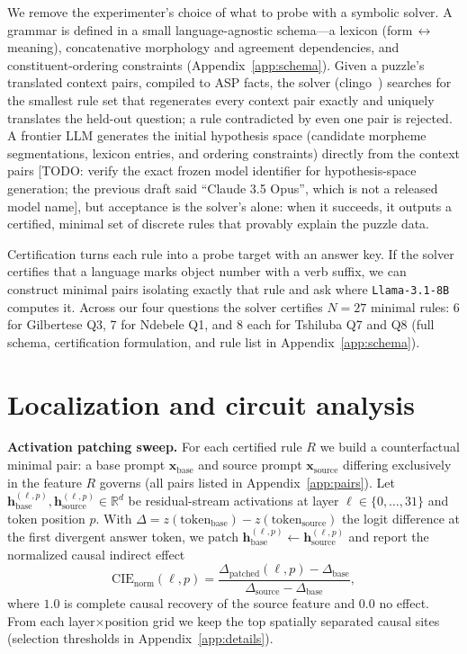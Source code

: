 \documentclass{article}
\newif\ifdraft\drafttrue
\newcommand{\TODO}[1]{\ifdraft\textcolor{red!70!black}{[TODO: #1]}\fi}
\begin{document}
We remove the experimenter's choice of what to probe with a symbolic solver.
A grammar is defined in a small language-agnostic schema---a lexicon
(form\,$\leftrightarrow$\,meaning), concatenative morphology and agreement
dependencies, and constituent-ordering constraints (Appendix~\ref{app:schema}).
Given a puzzle's translated context pairs, compiled to ASP facts, the solver
(clingo~\citep{clingo}) searches for the smallest rule set that regenerates
every context pair exactly and uniquely translates the held-out question; a
rule contradicted by even one pair is rejected. A frontier LLM generates the
initial hypothesis space (candidate morpheme segmentations, lexicon entries,
and ordering constraints) directly from the context pairs%
\TODO{verify the exact frozen model identifier for hypothesis-space
generation; the previous draft said ``Claude 3.5 Opus'', which is not a
released model name}, but acceptance is the solver's alone: when it succeeds,
it outputs a certified, minimal set of discrete rules that provably explain
the puzzle data.

Certification turns each rule into a probe target with an answer key. If the
solver certifies that a language marks object number with a verb suffix, we
can construct minimal pairs isolating exactly that rule and ask where
\texttt{Llama-3.1-8B} computes it. Across our four questions the solver
certifies $N=27$ minimal rules: 6 for Gilbertese Q3, 7 for Ndebele Q1, and 8
each for Tshiluba Q7 and Q8 (full schema, certification formulation, and rule
list in Appendix~\ref{app:schema}).

\section{Localization and circuit analysis}
\label{sec:methods}

\textbf{Activation patching sweep.}
For each certified rule $R$ we build a counterfactual minimal pair: a base
prompt $\mathbf{x}_{\text{base}}$ and source prompt $\mathbf{x}_{\text{source}}$
differing exclusively in the feature $R$ governs (all pairs listed in
Appendix~\ref{app:pairs}). Let $\mathbf{h}^{(\ell,p)}_{\text{base}},
\mathbf{h}^{(\ell,p)}_{\text{source}} \in \mathbb{R}^{d}$ be residual-stream
activations at layer $\ell \in \{0,\dots,31\}$ and token position $p$. With
$\Delta = z(\text{token}_{\text{base}}) - z(\text{token}_{\text{source}})$ the
logit difference at the first divergent answer token, we patch
$\mathbf{h}^{(\ell,p)}_{\text{base}} \leftarrow
\mathbf{h}^{(\ell,p)}_{\text{source}}$ and report the normalized causal
indirect effect
\begin{equation}
\mathrm{CIE}_{\mathrm{norm}}(\ell,p) =
\frac{\Delta_{\text{patched}}(\ell,p) - \Delta_{\text{base}}}
     {\Delta_{\text{source}} - \Delta_{\text{base}}},
\end{equation}
where $1.0$ is complete causal recovery of the source feature and $0.0$ no
effect. From each layer$\times$position grid we keep the top spatially
separated causal sites (selection thresholds in Appendix~\ref{app:details}).
\end{document}
